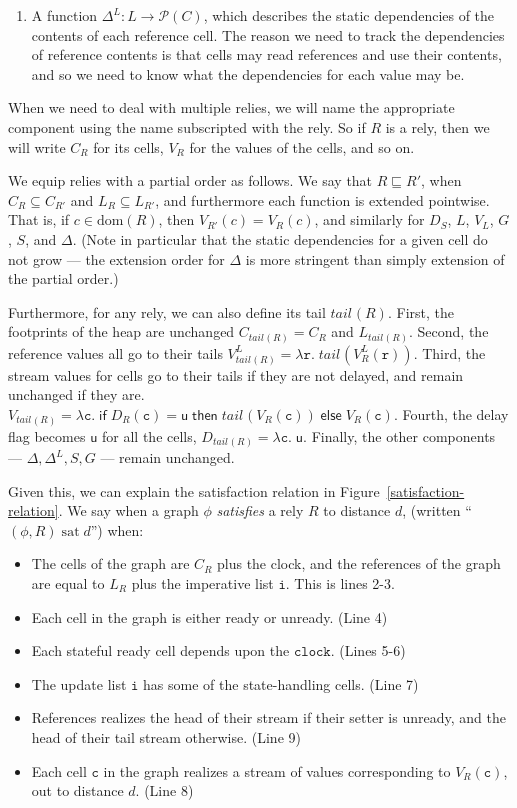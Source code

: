 \documentclass[nocopyrightspace,preprint]{sigplanconf}
\newcommand{\dom}[1]{\mathrm{dom}({#1})}
\newcommand{\term}[1]{\ensuremath{\mathtt{{#1}}}}
\newcommand{\powerset}[1]{\mathcal{P}(#1)}
\newcommand{\fun}[2]{\lambda {#1}.\;{#2}}
\newcommand{\U}{\mathsf{u}}
\newcommand{\tail}[2][]{\mathit{tail}^{#1}(#2)}
\newcommand{\satisfy}[2]{{#1}\;\mathrm{sat}\;{#2}}
\begin{document}
\begin{enumerate}
\item A function $\Delta^L : L \to \powerset{C}$, which describes the 
  static dependencies of the contents of each reference cell. The reason
  we need to track the dependencies of reference contents is that 
  cells may read references and use their contents, and so we need to 
  know what the dependencies for each value may be. 
\end{enumerate}

When we need to deal with multiple relies, we will name the
appropriate component using the name subscripted with the rely. So if
$R$ is a rely, then we will write $C_R$ for its cells, $V_R$ for the
values of the cells, and so on.

We equip relies with a partial order as follows. We say that $R
\sqsubseteq R'$, when $C_R \subseteq C_{R'}$ and $L_R \subseteq L_{R'}$, and
furthermore each function is extended pointwise. That is, if $c \in
\dom{R}$, then $V_{R'}(c) = V_{R}(c)$, and similarly for $D_S$, $L$,
$V_L$, $G$, $S$, and $\Delta$. (Note in particular that the static
dependencies for a given cell do not grow --- the extension order for
$\Delta$ is more stringent than simply extension of the partial order.)

Furthermore, for any rely, we can also define its tail
$\tail{R}$. First, the footprints of the heap are unchanged
$C_{\tail{R}} = C_R$ and $L_{\tail{R}}$. Second, the reference values
all go to their tails $V^L_{\tail{R}} =
\fun{\term{r}}{\tail{V^L_R(\term{r})}}$.  Third, the stream values for
cells go to their tails if they are not delayed, and remain unchanged
if they are. $V_{\tail{R}} = \fun{\term{c}}{\mathsf{if}\;D_R(\term{c})
  =
  \U\;\mathsf{then}\;\tail{V_R(\term{c})}\;\mathsf{else}\;V_R(\term{c})}$.
Fourth, the delay flag becomes $\U$ for all the cells, $D_{\tail{R}} = \fun{\term{c}}{\U}$. 
Finally, the other components --- $\Delta, \Delta^L, S, G$ --- remain unchanged. 

Given this, we can explain the satisfaction relation in
Figure~\ref{satisfaction-relation}. We say when a graph $\phi$
\emph{satisfies} a rely $R$ to distance $d$, (written
``$\satisfy{(\phi, R)}{d}$'') when:
\begin{itemize}
  \item The cells of the graph are $C_R$ plus the clock, and the references
    of the graph are equal to $L_R$ plus the imperative list \term{i}. This is lines 2-3. 
  \item Each cell in the graph is either ready or unready. (Line 4)
  \item Each stateful ready cell depends upon the \term{clock}. (Lines 5-6)
  \item The update list \term{i} has some of the state-handling cells. (Line 7)
  \item References realizes the head of their
    stream if their setter is unready, and the head of their tail
    stream otherwise. (Line 9)
  \item Each cell \term{c} in the graph realizes a stream of values corresponding
    to $V_R(\term{c})$, out to distance $d$. (Line 8)
\end{itemize}
\end{document}

